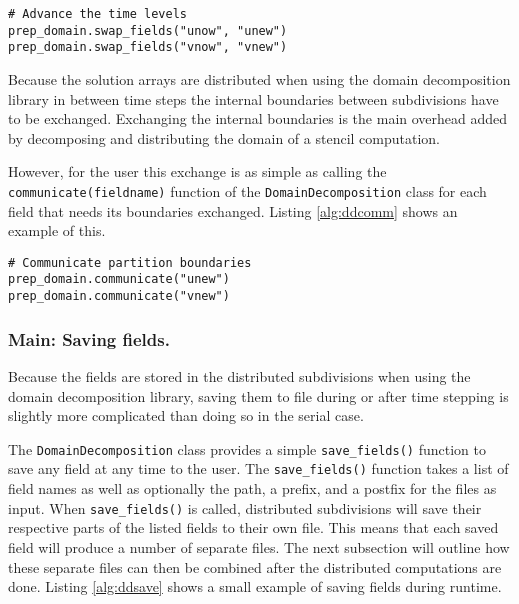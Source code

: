 \begin{lstlisting}[caption={Example code for swapping two arrays in the domain decomposition libarary},captionpos=b, label={alg:ddswap}, float, floatplacement=H]
# Advance the time levels
prep_domain.swap_fields("unow", "unew")
prep_domain.swap_fields("vnow", "vnew")
\end{lstlisting}

Because the solution arrays are distributed when using the domain decomposition library in between time steps the internal boundaries between subdivisions have to be exchanged.
Exchanging the internal boundaries is the main overhead added by decomposing and distributing the domain of a stencil computation.

However, for the user this exchange is as simple as calling the \texttt{communicate(fieldname)} function of the \texttt{DomainDecomposition} class for each field that needs its boundaries exchanged.
Listing \ref{alg:ddcomm} shows an example of this.

\begin{lstlisting}[caption={Example code for calling for internal boundary exchange of two fields in the domain decomposition library},captionpos=b, label={alg:ddcomm}, float, floatplacement=H]
# Communicate partition boundaries
prep_domain.communicate("unew")
prep_domain.communicate("vnew")
\end{lstlisting}

\subsubsection{Main: Saving fields.}
Because the fields are stored in the distributed subdivisions when using the domain decomposition library, saving them to file during or after time stepping is slightly more complicated than doing so in the serial case.

The \texttt{DomainDecomposition} class provides a simple \texttt{save\_fields()} function to save any field at any time to the user.
The \texttt{save\_fields()} function takes a list of field names as well as optionally the path, a prefix, and a postfix for the files as input.
When \texttt{save\_fields()} is called, distributed subdivisions will save their respective parts of the listed fields to their own file.
This means that each saved field will produce a number of separate files.
The next subsection will outline how these separate files can then be combined after the distributed computations are done.
Listing \ref{alg:ddsave} shows a small example of saving fields during runtime.

